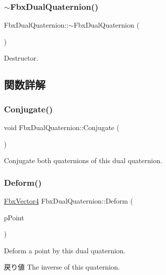 \subsubsection{\texorpdfstring{$\sim$\+Fbx\+Dual\+Quaternion()}{~FbxDualQuaternion()}}
{\footnotesize\ttfamily Fbx\+Dual\+Quaternion\+::$\sim$\+Fbx\+Dual\+Quaternion (\begin{DoxyParamCaption}{ }\end{DoxyParamCaption})}



Destructor. 



\subsection{関数詳解}
\mbox{\label{class_fbx_dual_quaternion_a4b868a1951c6c4bdf81d30acbc5dec87}} 
\subsubsection{\texorpdfstring{Conjugate()}{Conjugate()}}
{\footnotesize\ttfamily void Fbx\+Dual\+Quaternion\+::\+Conjugate (\begin{DoxyParamCaption}{ }\end{DoxyParamCaption})}

Conjugate both quaternions of this dual quaternion. \mbox{\label{class_fbx_dual_quaternion_a9a3380796ebd7bdcdc0c3f7363181b0f}} 
\subsubsection{\texorpdfstring{Deform()}{Deform()}}
{\footnotesize\ttfamily \hyperlink{class_fbx_vector4}{Fbx\+Vector4} Fbx\+Dual\+Quaternion\+::\+Deform (\begin{DoxyParamCaption}\item[{\hyperlink{class_fbx_vector4}{Fbx\+Vector4} \&}]{p\+Point }\end{DoxyParamCaption})}

Deform a point by this dual quaternion. \begin{DoxyReturn}{戻り値}
The inverse of this quaternion. 
\end{DoxyReturn}
\mbox{\label{class_fbx_dual_quaternion_ac932bf84d0cf5a6e397de55fdde914a6}} 

